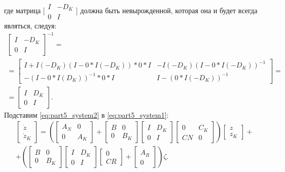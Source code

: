где матрица $\bigl[ \begin{smallmatrix}  {I} & -{D}_K \\ 0 & {I} \end{smallmatrix} \bigr]$ должна быть невырожденной, которая она и будет всегда являться, следуя:
\begin{equation}
	\begin{gathered}
		\begin{bmatrix}
			{I} & -{D}_K \\ 0 & {I}
		\end{bmatrix}^{-1} = 
		\\
		=\begin{bmatrix}
			{I} + {I}(-{D}_K)({I}-0*{I}(-{D}_K))*0*{I} & -{I}(-{D}_K)({I}-0*{I}(-{D}_K))^{-1}\\
			-({I} - 0*{I}({D}_K))^{-1}*0*{I} &
			{I}-(0*{I}(-{D}_K))^{-1}
		\end{bmatrix}= \\
		=
		\begin{bmatrix}
			{I} & {D}_K \\ 0 & {I}
		\end{bmatrix}.
	\end{gathered}
\end{equation}
Подставим \eqref{eq:part5_system2} в \eqref{eq:part5_system1}:
\begin{align}
	\nonumber
	& \begin{bmatrix}
		{\dot{z}} \\ {\dot{z}}_K 
	\end{bmatrix}
	=\left(
	\begin{bmatrix}
		{A}_N & 0 \\
		0 & {A}_K
	\end{bmatrix}
	+
	\begin{bmatrix}
		{B} & 0 \\
		0 & {B}_K
	\end{bmatrix}
	\begin{bmatrix}
		{I} & {D}_K \\
		0 & {I}
	\end{bmatrix}
	\begin{bmatrix}
		0 & {C}_K \\
		{C}{N} & 0
	\end{bmatrix}
	\right)
	\begin{bmatrix}
		{z} \\ {z}_K
	\end{bmatrix}
	+ \\
	& + \left(
	\begin{bmatrix}
		{B} & 0 \\
		0 & {B}_K
	\end{bmatrix}
	\begin{bmatrix}
		{I} & {D}_K \\
		0 & {I}
	\end{bmatrix}
	\begin{bmatrix}
		0 \\ {C}{R}
	\end{bmatrix}
	+
	\begin{bmatrix}
		{A}_R \\ 0 
	\end{bmatrix}\right)
	{\zeta}.
\end{align}
